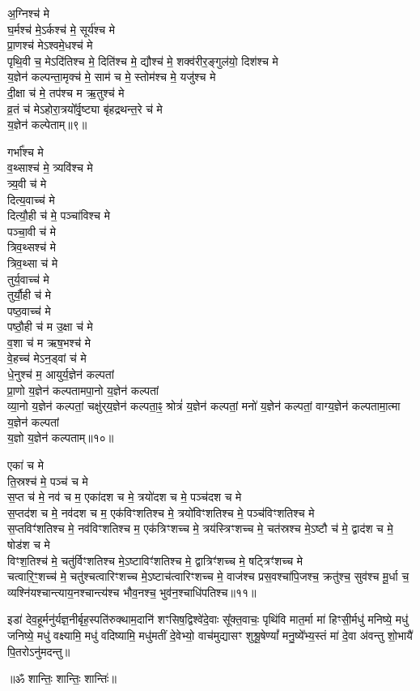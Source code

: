 अ॒ग्निश्च॑ मे\\
घ॒र्मश्च॑ मे॒ऽर्कश्च॑ मे॒ सूर्य॑श्च मे\\
प्रा॒णश्च॑ मेऽश्वमे॒धश्च॑ मे\\
पृथि॒वी च॒ मेऽदि॑तिश्च मे॒ दिति॑श्च मे॒ द्यौश्च॑ मे॒ शक्व॑रीर॒ङ्गुल॑यो॒ दिश॑श्च मे\\
य॒ज्ञेन॑ कल्पन्ता॒मृक्च॑ मे॒ साम॑ च मे॒ स्तोम॑श्च मे॒ यजु॑श्च मे\\
दी॒क्षा च॑ मे॒ तप॑श्च म ऋ॒तुश्च॑ मे\\
व्र॒तं च॑ मेऽहोरा॒त्रयो᳚र्वृ॒ष्ट्या बृ॑हद्रथन्त॒रे च॑ मे\\
य॒ज्ञेन॑ कल्पेताम्॥९॥ 

गर्भा᳚श्च मे\\
व॒थ्साश्च॑ मे॒ त्र्यवि॑श्च मे\\
त्र्य॒वी च॑ मे\\
दित्य॒वाच्च॑ मे\\
दित्यौ॒ही च॑ मे॒ पञ्चा॑विश्च मे\\
पञ्चा॒वी च॑ मे\\
त्रिव॒थ्सश्च॑ मे\\
त्रिव॒थ्सा च॑ मे\\
तुर्य॒वाच्च॑ मे\\
तुर्यौ॒ही च॑ मे\\
पष्ठ॒वाच्च॑ मे\\
पष्ठौ॒ही च॑ म उ॒क्षा च॑ मे\\
व॒शा च॑ म ऋष॒भश्च॑ मे\\
वे॒हच्च॑ मेऽन॒ड्वां च॑ मे\\
धे॒नुश्च॑ म॒ आयुर्य॒ज्ञेन॑ कल्पतां\\
प्रा॒णो य॒ज्ञेन॑ कल्पतामपा॒नो य॒ज्ञेन॑ कल्पतां\\
व्या॒नो य॒ज्ञेन॑ कल्पतां॒ चक्षु॑र्‌य॒ज्ञेन॑ कल्पता॒ꣴ॒ श्रोत्रं॑ य॒ज्ञेन॑ कल्पतां॒ मनो॑ य॒ज्ञेन॑ कल्पतां॒ वाग्य॒ज्ञेन॑ कल्पतामा॒त्मा य॒ज्ञेन॑ कल्पतां\\
य॒ज्ञो य॒ज्ञेन॑ कल्पताम्॥१०॥ 

एका॑ च मे\\
ति॒स्रश्च॑ मे॒ पञ्च॑ च मे\\
स॒प्त च॑ मे॒ नव॑ च म॒ एका॑दश च मे॒ त्रयो॑दश च मे॒ पञ्च॑दश च मे\\
स॒प्तद॑श च मे॒ नव॑दश च म॒ एक॑विꣳशतिश्च मे॒ त्रयो॑विꣳशतिश्च मे॒ पञ्च॑विꣳशतिश्च मे\\
स॒प्तविꣳ॑शतिश्च मे॒ नव॑विꣳशतिश्च म॒ एक॑त्रिꣳशच्च मे॒ त्रय॑स्त्रिꣳशच्च मे॒ चत॑स्रश्च मे॒ऽष्टौ च॑ मे॒ द्वाद॑श च मे॒ षोड॑श च मे\\
विꣳश॒तिश्च॑ मे॒ चतु॑र्विꣳशतिश्च मे॒ऽष्टाविꣳ॑शतिश्च मे॒ द्वात्रिꣳ॑शच्च मे॒ षट्त्रिꣳ॑शच्च मे\\
चत्वारि॒ꣳ॒शच्च॑ मे॒ चतु॑श्चत्वारिꣳशच्च मे॒ऽष्टाच॑त्वारिꣳशच्च मे॒ वाज॑श्च प्रस॒वश्चा॑पि॒जश्च॒ क्रतु॑श्च॒ सुव॑श्च मू॒र्धा च॒ व्यश्नि॑यश्चान्त्याय॒नश्चान्त्य॑श्च भौव॒नश्च॒ भुव॑न॒श्चाधि॑पतिश्च॥११॥ 

इडा॑ देव॒हूर्मनु॑र्यज्ञ॒नीर्बृह॒स्पति॑रुक्थाम॒दानि॑ शꣳसिष॒द्विश्वे॑दे॒वाः सू᳚क्त॒वाचः॒ पृथि॑वि मात॒र्मा मा॑ हिꣳसी॒र्मधु॑ मनिष्ये॒ मधु॑ जनिष्ये॒ मधु॑ वक्ष्यामि॒ मधु॑ वदिष्यामि॒ मधु॑मतीं दे॒वेभ्यो॒ वाच॑मुद्यासꣳ शुश्रू॒षेण्यां᳚ मनु॒ष्ये᳚भ्य॒स्तं मा॑ दे॒वा अ॑वन्तु शो॒भायै॑ पि॒तरोऽनु॑मदन्तु॥ 

\centerline{॥ॐ शान्तिः॒ शान्तिः॒ शान्तिः॑॥}


